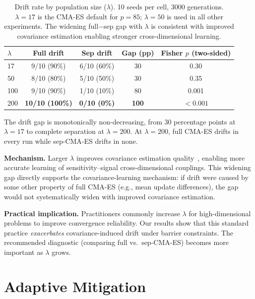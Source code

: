 \documentclass[twoside]{article}
\begin{document}
\begin{table}[t]
\caption{Drift rate by population size ($\lambda$). 10 seeds per cell,
3000 generations. $\lambda = 17$ is the CMA-ES default for $p = 85$;
$\lambda = 50$ is used in all other experiments. The widening
full$-$sep gap with $\lambda$ is consistent with improved covariance
estimation enabling stronger cross-dimensional learning.}
\label{tab:lambda}
\centering
\begin{tabular}{lcccc}
\toprule
$\lambda$ & Full drift & Sep drift & Gap (pp) & Fisher $p$ (two-sided) \\
\midrule
17  & 9/10 (90\%)  & 6/10 (60\%)  & 30  & 0.30 \\
50  & 8/10 (80\%)  & 5/10 (50\%)  & 30  & 0.35 \\
100 & 9/10 (90\%)  & 1/10 (10\%)  & 80  & 0.001 \\
200 & \textbf{10/10 (100\%)} & \textbf{0/10 (0\%)} & \textbf{100} & $< 0.001$ \\
\bottomrule
\end{tabular}
\end{table}

The drift gap is monotonically non-decreasing, from 30 percentage points at
$\lambda = 17$ to complete separation at $\lambda = 200$. At $\lambda = 200$,
full CMA-ES drifts in every run while sep-CMA-ES drifts in none.

\textbf{Mechanism.} Larger $\lambda$ improves covariance
estimation quality~\citep{hansen2003reducing}, enabling more accurate
learning of sensitivity--signal cross-dimensional couplings. This widening gap
directly supports the covariance-learning mechanism: if drift were caused by some other property of full CMA-ES
(e.g., mean update differences), the gap would not systematically widen
with improved covariance estimation.

\textbf{Practical implication.} Practitioners commonly increase $\lambda$
for high-dimensional problems to improve convergence reliability. Our results
show that this standard practice \emph{exacerbates} covariance-induced drift
under barrier constraints. The recommended diagnostic (comparing full vs.\
sep-CMA-ES) becomes more important as $\lambda$ grows.

\section{Adaptive Mitigation}
\label{sec:mitigation}
\end{document}

